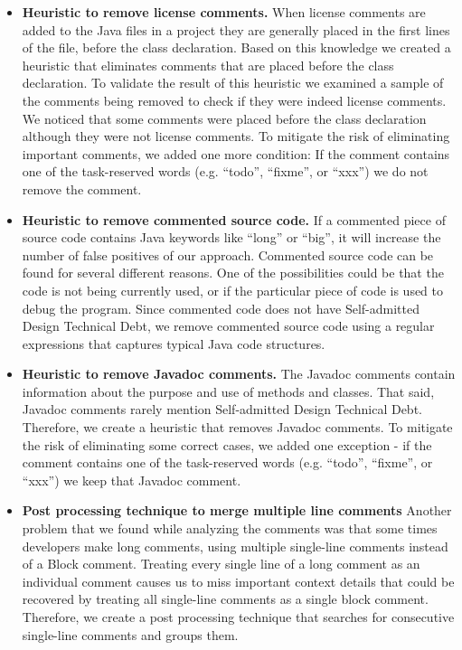 \documentclass[conference]{IEEEtran}
\newcommand{\SADTD}{Self-admitted Design Technical Debt\xspace}
\begin{document}
 
\begin{itemize}


\item{\textbf{Heuristic to remove license comments.}} 
When license comments are added to the Java files in a project they are generally placed in the first lines of the file, before the class declaration. Based on this knowledge we created a heuristic that eliminates comments that are placed before the class declaration. To validate the result of this heuristic we examined a sample of the comments being removed to check if they were indeed license comments. We noticed that some comments were placed before the class declaration although they were not license comments. To mitigate the risk of eliminating important comments, we added one more condition: If the comment contains one of the task-reserved words (e.g. ``todo'', ``fixme'', or ``xxx'') we do not remove the comment.

\item{\textbf{Heuristic to remove commented source code.}}
If a commented piece of source code contains Java keywords like ``long'' or ``big'', it will increase the number of false positives of our approach. Commented source code can be found for several different reasons. One of the possibilities could be that the code is not being currently used, or if the particular piece of code is used to debug the program. Since commented code does not have \SADTD, we remove commented source code using a regular expressions that captures typical Java code structures.

\item{\textbf{Heuristic to remove Javadoc comments.}}
The Javadoc comments contain information about the purpose and use of methods and classes. That said, Javadoc comments rarely mention \SADTD. Therefore, we create a heuristic that removes Javadoc comments. To mitigate the risk of eliminating some correct cases, we added one exception - if the comment contains one of the task-reserved words (e.g. ``todo'', ``fixme'', or ``xxx'') we keep that Javadoc comment. 

\item{\textbf{Post processing technique to merge multiple line comments}}
Another problem that we found while analyzing the comments was that some times developers make long comments, using multiple single-line comments instead of a Block comment. Treating every single line of a long comment as an individual comment causes us to miss important context details that could be recovered by treating all single-line comments as a single block comment. Therefore, we create a post processing technique that searches for consecutive single-line comments and groups them. 

\end{itemize}
\end{document}
